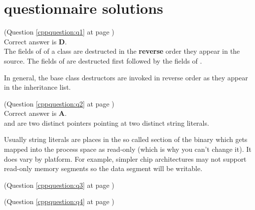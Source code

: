 \chapter{\CC questionnaire solutions}

\begin{cppanswer}
    \label{cppquestion:s1}
    (Question \ref{cppquestion:q1} at page \pageref{cppquestion:q1}) \hfill \\
    Correct answer is \textbf{D}. \\
    The fields of of a class are destructed in the \textbf{reverse} order they appear in the source. 
    The fields of  are destructed first followed by the fields of . 
    
    In general, the base class destructors are invoked in reverse order as they appear in the inheritance list.
\end{cppanswer}

\begin{cppanswer}
    \label{cppquestion:s2}
    (Question \ref{cppquestion:q2} at page \pageref{cppquestion:q2}) \hfill \\
    Correct answer is \textbf{A}. \\
     and  are two distinct pointers  pointing at two distinct string literals. 

    Usually string literals are places in  the so called  section of the binary which gets mapped into the process space as read-only (which is why you can't change it).
    It does vary by platform. For example, simpler chip architectures may not support read-only memory segments so the data segment will be writable.
\end{cppanswer}

\begin{cppanswer}
    \label{cppquestion:s3}
    (Question \ref{cppquestion:q3} at page \pageref{cppquestion:q3}) \hfill \\

\end{cppanswer}

\begin{cppanswer}
    \label{cppquestion:s4}
    (Question \ref{cppquestion:q4} at page \pageref{cppquestion:q4}) \hfill \\

\end{cppanswer}

